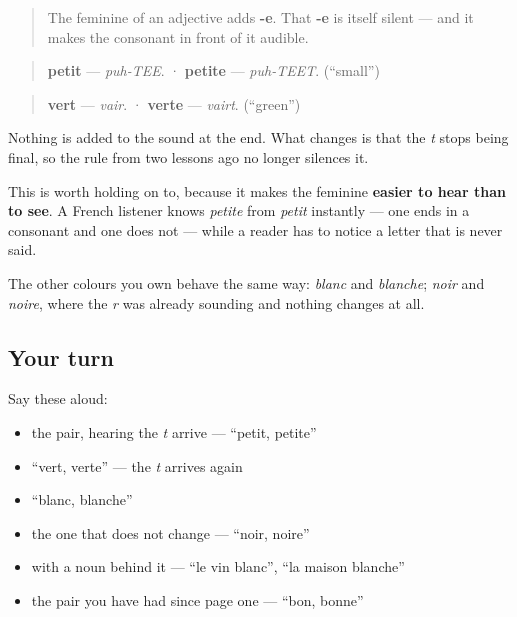 \begin{cousinweb}
\begin{quote}
The feminine of an adjective adds \textbf{-e}. That \textbf{-e} is itself silent — and it makes the consonant in front of it audible.
\end{quote}

\begin{quote}
\textbf{petit} — \emph{puh-TEE}. · \textbf{petite} — \emph{puh-TEET}. (\textquotedblleft{}small\textquotedblright{})
\end{quote}

\begin{quote}
\textbf{vert} — \emph{vair}. · \textbf{verte} — \emph{vairt}. (\textquotedblleft{}green\textquotedblright{})
\end{quote}

Nothing is added to the sound at the end. What changes is that the \emph{t} stops being final, so the rule from two lessons ago no longer silences it.

This is worth holding on to, because it makes the feminine \textbf{easier to hear than to see}. A French listener knows \emph{petite} from \emph{petit} instantly — one ends in a consonant and one does not — while a reader has to notice a letter that is never said.

The other colours you own behave the same way: \emph{blanc} and \emph{blanche}; \emph{noir} and \emph{noire}, where the \emph{r} was already sounding and nothing changes at all.
\end{cousinweb}

\subsection*{Your turn}
Say these aloud:

\begin{itemize}
\raggedright
  \item the pair, hearing the \emph{t} arrive — \textquotedblleft{}petit, petite\textquotedblright{}
  \item \textquotedblleft{}vert, verte\textquotedblright{} — the \emph{t} arrives again
  \item \textquotedblleft{}blanc, blanche\textquotedblright{}
  \item the one that does not change — \textquotedblleft{}noir, noire\textquotedblright{}
  \item with a noun behind it — \textquotedblleft{}le vin blanc\textquotedblright{}, \textquotedblleft{}la maison blanche\textquotedblright{}
  \item the pair you have had since page one — \textquotedblleft{}bon, bonne\textquotedblright{}
\end{itemize}

